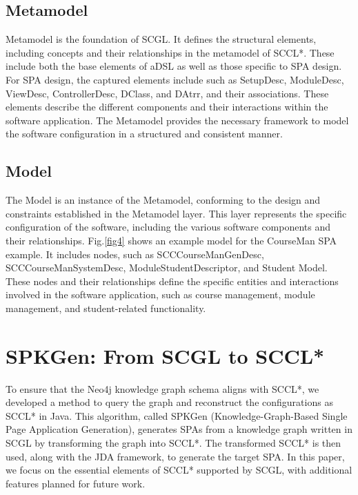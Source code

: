 \documentclass[runningheads]{llncs}
\begin{document}
\subsection{Metamodel}
Metamodel is the foundation of SCGL.  It defines the structural elements, including concepts and their relationships in the metamodel of SCCL*.  These include both the base elements of aDSL as well as those specific to SPA design. For SPA design, the captured elements include such as SetupDesc, ModuleDesc, ViewDesc, ControllerDesc, DClass, and DAtrr, and their associations. These elements describe the different components and their interactions within the software application. The Metamodel provides the necessary framework to model the software configuration in a structured and consistent manner.

\subsection{Model}
The Model is an instance of the Metamodel, conforming to the design and constraints established in the Metamodel layer. This layer represents the specific configuration of the software, including the various software components and their relationships.
Fig.\ref{fig4} shows an example model for the CourseMan SPA example. It includes nodes, such as SCCCourseManGenDesc, SCCCourseManSystemDesc, ModuleStudentDescriptor, and Student Model. These nodes and their relationships define the specific entities and interactions involved in the software application, such as course management, module management, and student-related functionality.

\section{SPKGen: From SCGL to SCCL*} \label{section4}
To ensure that the Neo4j knowledge graph schema aligns with SCCL*, we developed a method to query the graph and reconstruct the configurations as SCCL* in Java. This algorithm, called SPKGen (Knowledge-Graph-Based Single Page Application Generation), generates SPAs from a knowledge graph written in SCGL by transforming the graph into SCCL*. The transformed SCCL* is then used, along with the JDA framework, to generate the target SPA. In this paper, we focus on the essential elements of SCCL* supported by SCGL, with additional features planned for future work.
\end{document}
